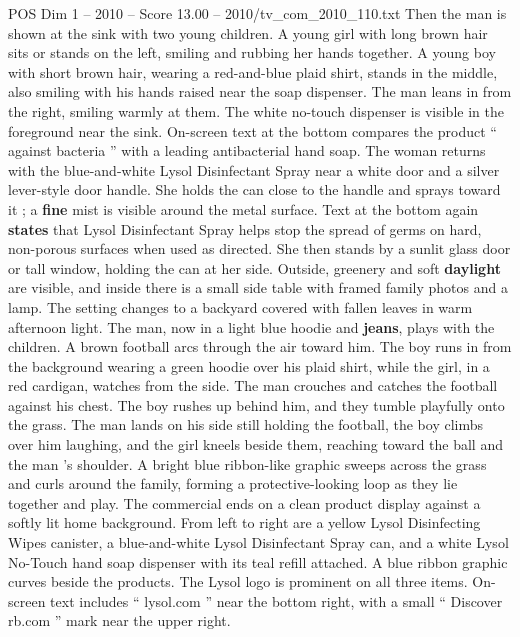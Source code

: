 \begin{textsample}{POS Dim 1 – 2010 – Score 13.00 – 2010/tv\_com\_2010\_110.txt}
Then the man is shown at the sink with two young children.
A young girl with long brown hair sits or stands on the left, smiling and rubbing her hands together.
A young boy with short brown hair, wearing a red-and-blue plaid shirt, stands in the middle, also smiling with his hands raised near the soap dispenser.
The man leans in from the right, smiling warmly at them.
The white no-touch dispenser is visible in the foreground near the sink.
On-screen text at the bottom compares the product “ against bacteria ” with a leading antibacterial hand soap.
The woman returns with the blue-and-white Lysol Disinfectant Spray near a white door and a silver lever-style door handle.
She holds the can close to the handle and sprays toward it ; a \textbf{fine} mist is visible around the metal surface.
Text at the bottom again \textbf{states} that Lysol Disinfectant Spray helps stop the spread of germs on hard, non-porous surfaces when used as directed.
She then stands by a sunlit glass door or tall window, holding the can at her side.
Outside, greenery and soft \textbf{daylight} are visible, and inside there is a small side table with framed family photos and a lamp.
The setting changes to a backyard covered with fallen leaves in warm afternoon light.
The man, now in a light blue hoodie and \textbf{jeans}, plays with the children.
A brown football arcs through the air toward him.
The boy runs in from the background wearing a green hoodie over his plaid shirt, while the girl, in a red cardigan, watches from the side.
The man crouches and catches the football against his chest.
The boy rushes up behind him, and they tumble playfully onto the grass.
The man lands on his side still holding the football, the boy climbs over him laughing, and the girl kneels beside them, reaching toward the ball and the man ’s shoulder.
A bright blue ribbon-like graphic sweeps across the grass and curls around the family, forming a protective-looking loop as they lie together and play.
The commercial ends on a clean product display against a softly lit home background.
From left to right are a yellow Lysol Disinfecting Wipes canister, a blue-and-white Lysol Disinfectant Spray can, and a white Lysol No-Touch hand soap dispenser with its teal refill attached.
A blue ribbon graphic curves beside the products.
The Lysol logo is prominent on all three items.
On-screen text includes “ lysol.com ” near the bottom right, with a small “ Discover rb.com ” mark near the upper right.

\end{textsample}
